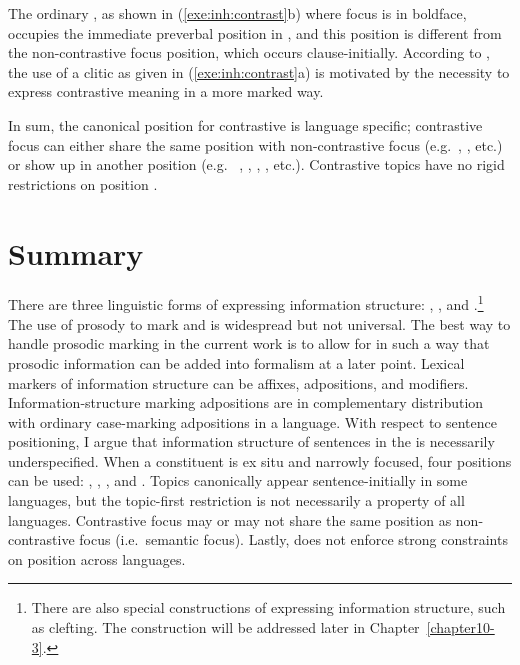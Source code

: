 \noindent The ordinary , as shown in
(\ref{exe:inh:contrast}b) where focus is in boldface, occupies the
immediate preverbal position in , and this position is
different from the non-contrastive focus position, which occurs
clause-initially.  According to \citeauthor{nichols:11}, the use of a
clitic as given in (\ref{exe:inh:contrast}a) is motivated by the
necessity to express contrastive meaning in a more marked way.



In sum, the canonical position for contrastive  is language
specific; contrastive focus can either share the same position with
non-contrastive focus (e.g.\ ,  \citep{gryllia:09},
etc.)  or show up in another position (e.g.\ 
\citep{ambar:99},  \citep{neeleman:titov:09},
 \citep{skopeteas:fanselow:10}, 
\citep{nichols:11}, etc.). Contrastive topics have no rigid
restrictions on position \citep{erteschik:07,bianchi:frascarelli:10}.


\section{Summary}
\label{4:sec:summary}


There are three linguistic forms of expressing information structure:
,  , and .\footnote{There are also 
special constructions of expressing information structure, such as clefting.
The construction will be addressed later in Chapter~\ref{chapter10-3}.} 
The use of prosody to mark  and
 is widespread but not universal. The best way to handle prosodic
marking in the current work is to allow for 
in such a way that prosodic information can be added into formalism at
a later point. Lexical markers of information structure
can be affixes, adpositions, and modifiers. 
Information-structure marking adpositions are in
complementary distribution with ordinary case-marking adpositions in a
language. With respect to sentence positioning, I argue that
information structure of sentences in the  is
necessarily underspecified. When a constituent is ex situ and
narrowly focused, four positions can be used: ,
, , and .  Topics
canonically appear sentence-initially in some languages, but the
topic-first restriction is not necessarily a property of all
languages. Contrastive focus may or may not share the same position as
non-contrastive focus (i.e.\ semantic focus).
Lastly,  does not enforce strong 
constraints on position across languages.

